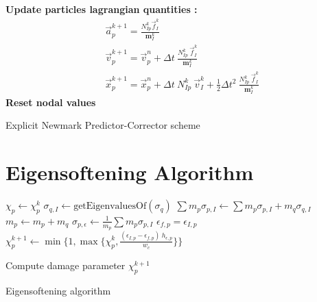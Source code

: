 \message{ !name(2020_EFM_MPM_Eigensoftening.tex)}\documentclass[preprint,12pt,a4paper]{elsarticle}
\newcommand{\tens}[1]{
  \ensuremath{\mathbf{{#1}}}
}
\begin{document}
\begin{algorithm}[H]
    \textbf{Update particles lagrangian quantities :}
    \begin{align*}
      &\vec{a}_p^{k+1} = \frac{N_{Ip}^k\vec{f}_{I}^{k}}{\tens{m}_I^k}\\
      &\vec{v}_p^{k+1} = \vec{v}_p^n + \Delta t\
        \frac{N_{Ip}^k\
        \vec{f}_{I}^{k}}{\tens{m}_I^k}\\
      &\vec{x}_p^{k+1} = \vec{x}_p^n + \Delta t\
         N_{Ip}^k\ \vec{v}_{I}^{k} +
        \frac{1}{2}\Delta t^2\ \frac{N_{Ip}^k\
        \vec{f}_{I}^{k}}{\tens{m}_I^k}
    \end{align*}\;
    \textbf{Reset nodal values}\;
    \label{alg-epc}
    \caption{Explicit Newmark Predictor-Corrector scheme}
\end{algorithm} 

\section{Eigensoftening Algorithm}
\label{sec:eigens-algor-1}

\begin{algorithm}[H]
  \DontPrintSemicolon
  $\chi_p \leftarrow \chi_p^{k}$ \;
  \For{$p$ to $N_p$}
  {
    {
      {
        $\sigma_{q,I} \leftarrow \text{getEigenvaluesOf}(\sigma_{q})$ \;
        {
          $\sum m_p\sigma_{p,I} \leftarrow \sum m_p\sigma_{p,I} + m_q\sigma_{q,I}$ \;
        }
        $m_p \leftarrow m_p + m_q$ \;
      }
      $\sigma_{p,\epsilon} \leftarrow \frac{1}{m_p} \sum m_p\sigma_{p,I}$\;
      {
        $\epsilon_{f,p} = \epsilon_{I,p}$ \;  
      }
      {
        $\chi_p^{k+1} \leftarrow \min\Big \{1 , \max \{\chi_p^{k},
        \frac{(\epsilon_{I,p}- \epsilon_{f,p})\ h_{\epsilon,p}}{w_c}
        \} \Big \}$ \;
      }
    }
  }
  \caption{Compute damage parameter $\chi_p^{k+1}$}
  \label{alg-eigens}
  \caption{Eigensoftening algorithm}
\end{algorithm}
\end{document}
